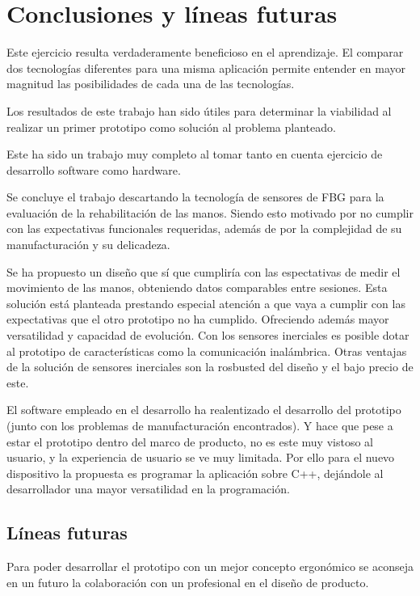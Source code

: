 \chapter{Conclusiones y líneas futuras\label{sec:conclusiones}}


Este ejercicio resulta verdaderamente beneficioso en el aprendizaje. El comparar dos tecnologías diferentes para una misma aplicación permite entender en mayor magnitud las posibilidades de cada una de las tecnologías. 

\textcolor{rositaoscuro}{Los resultados de este trabajo han sido útiles para determinar la viabilidad al realizar un primer prototipo como solución al problema planteado.}

Este ha sido un trabajo muy completo al tomar tanto en cuenta ejercicio de desarrollo software como hardware. 

Se concluye el trabajo descartando la tecnología de sensores de FBG para la evaluación de la rehabilitación de las manos. Siendo esto motivado por no cumplir con las expectativas funcionales requeridas, además de por la complejidad de su manufacturación y su delicadeza. 

Se ha propuesto un diseño que sí que cumpliría con las espectativas de medir el movimiento de las manos, obteniendo datos comparables entre sesiones. Esta solución está planteada prestando especial atención a que vaya a cumplir con las expectativas que el otro prototipo no ha cumplido. Ofreciendo además mayor versatilidad y capacidad de evolución. Con los sensores inerciales es posible dotar al prototipo de características como la comunicación inalámbrica. Otras ventajas de la solución de sensores inerciales son la rosbusted del diseño y el bajo precio de este.

El software empleado en el desarrollo ha realentizado el desarrollo del prototipo (junto con los problemas de manufacturación encontrados). Y hace que pese a estar el prototipo dentro del marco de producto, no es este muy vistoso al usuario, y la experiencia de usuario se ve muy limitada. Por ello para el nuevo dispositivo la propuesta es programar la aplicación sobre C++, dejándole al desarrollador una mayor versatilidad en la programación.

\section{Líneas futuras}

Para poder desarrollar el prototipo con un mejor concepto ergonómico se aconseja en un futuro la colaboración con un profesional en el diseño de producto. 

